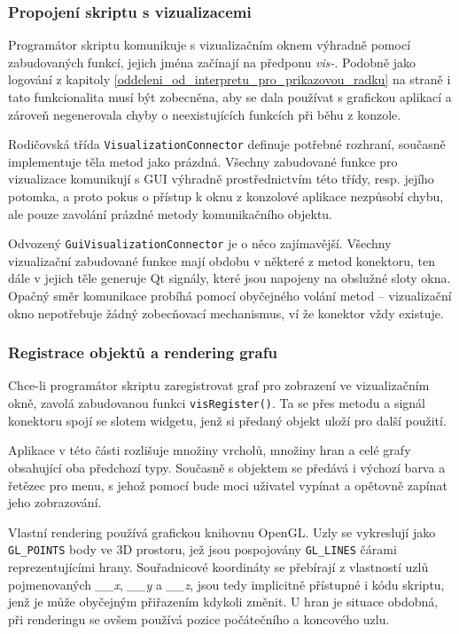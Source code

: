 \documentclass[11pt,twoside,a4paper]{book}
\begin{document}
\subsubsection{Propojení skriptu s vizualizacemi}

Programátor skriptu komunikuje s vizualizačním oknem výhradně pomocí zabudovaných funkcí, jejich jména začínají na předponu \textit{vis-}. Podobně jako logování z kapitoly \ref{oddeleni_od_interpretu_pro_prikazovou_radku} na straně \pageref{oddeleni_od_interpretu_pro_prikazovou_radku} i tato funkcionalita musí být zobecněna, aby se dala používat s grafickou aplikací a zároveň negenerovala chyby o neexistujících funkcích při běhu z konzole.

Rodičovská třída \texttt{VisualizationConnector} definuje potřebné rozhraní, současně implementuje těla metod jako prázdná. Všechny zabudované funkce pro vizualizace komunikují s GUI výhradně prostřednictvím této třídy, resp. jejího potomka, a proto pokus o přístup k oknu z konzolové aplikace nezpůsobí chybu, ale pouze zavolání prázdné metody komunikačního objektu.

Odvozený \texttt{GuiVisualizationConnector} je o něco zajímavější. Všechny vizualizační zabudované funkce mají obdobu v některé z metod konektoru, ten dále v jejich těle generuje Qt signály, které jsou napojeny na obslužné sloty okna. Opačný směr komunikace probíhá pomocí obyčejného volání metod -- vizualizační okno nepotřebuje žádný zobecňovací mechanismus, ví že konektor vždy existuje.


\subsubsection{Registrace objektů a rendering grafu}

Chce-li programátor skriptu zaregistrovat graf pro zobrazení ve vizualizačním okně, zavolá zabudovanou funkci \texttt{visRegister()}. Ta se přes metodu a signál konektoru spojí se slotem widgetu, jenž si předaný objekt uloží pro další použití.

Aplikace v této části rozlišuje množiny vrcholů, množiny hran a celé grafy obsahující oba předchozí typy. Současně s objektem se předává i výchozí barva a řetězec pro menu, s jehož pomocí bude moci uživatel vypínat a opětovně zapínat jeho zobrazování.

Vlastní rendering používá grafickou knihovnu OpenGL. Uzly se vykreslují jako \texttt{GL\_POINTS} body ve 3D prostoru, jež jsou pospojovány \texttt{GL\_LINES} čárami reprezentujícími hrany. Sou\-řad\-ni\-co\-vé koordináty se přebírají z vlastností uzlů pojmenovaných \textit{\_\_x}, \textit{\_\_y} a \textit{\_\_z}, jsou tedy implicitně přístupné i kódu skriptu, jenž je může obyčejným přiřazením kdykoli změnit. U hran je situace obdobná, při renderingu se ovšem používá pozice počátečního a koncového uzlu.
\end{document}
